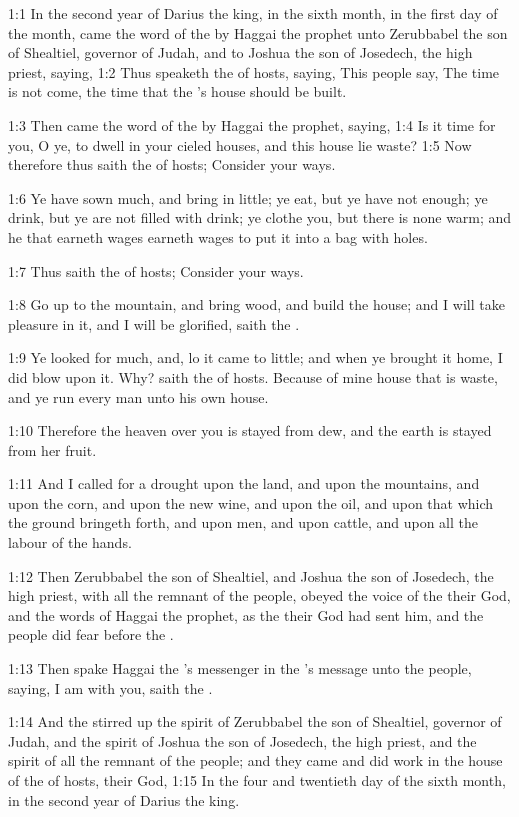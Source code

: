 

1:1 In the second year of Darius the king, in the sixth month, in the first day of the month, came the word of the \LORD by Haggai the prophet unto Zerubbabel the son of Shealtiel, governor of Judah, and to Joshua the son of Josedech, the high priest, saying, 1:2 Thus speaketh the \LORD of hosts, saying, This people say, The time is not come, the time that the \LORD's house should be built.

1:3 Then came the word of the \LORD by Haggai the prophet, saying, 1:4 Is it time for you, O ye, to dwell in your cieled houses, and this house lie waste?  1:5 Now therefore thus saith the \LORD of hosts; Consider your ways.

1:6 Ye have sown much, and bring in little; ye eat, but ye have not enough; ye drink, but ye are not filled with drink; ye clothe you, but there is none warm; and he that earneth wages earneth wages to put it into a bag with holes.

1:7 Thus saith the \LORD of hosts; Consider your ways.

1:8 Go up to the mountain, and bring wood, and build the house; and I will take pleasure in it, and I will be glorified, saith the \LORD.

1:9 Ye looked for much, and, lo it came to little; and when ye brought it home, I did blow upon it. Why? saith the \LORD of hosts. Because of mine house that is waste, and ye run every man unto his own house.

1:10 Therefore the heaven over you is stayed from dew, and the earth is stayed from her fruit.

1:11 And I called for a drought upon the land, and upon the mountains, and upon the corn, and upon the new wine, and upon the oil, and upon that which the ground bringeth forth, and upon men, and upon cattle, and upon all the labour of the hands.

1:12 Then Zerubbabel the son of Shealtiel, and Joshua the son of Josedech, the high priest, with all the remnant of the people, obeyed the voice of the \LORD their God, and the words of Haggai the prophet, as the \LORD their God had sent him, and the people did fear before the \LORD.

1:13 Then spake Haggai the \LORD's messenger in the \LORD's message unto the people, saying, I am with you, saith the \LORD.

1:14 And the \LORD stirred up the spirit of Zerubbabel the son of Shealtiel, governor of Judah, and the spirit of Joshua the son of Josedech, the high priest, and the spirit of all the remnant of the people; and they came and did work in the house of the \LORD of hosts, their God, 1:15 In the four and twentieth day of the sixth month, in the second year of Darius the king.

